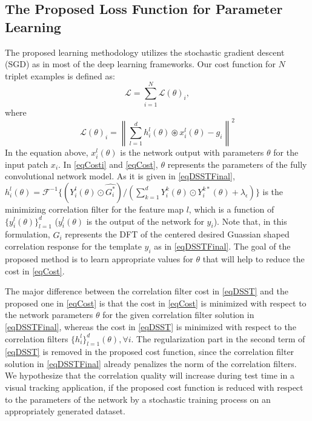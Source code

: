 \documentclass[journal]{IEEEtran}
\begin{document}
\subsection{The Proposed Loss Function for Parameter Learning}
The proposed learning methodology utilizes the stochastic gradient descent (SGD) as in most of the deep learning frameworks. Our cost function for $N$ triplet examples is defined as:
\begin{equation}
\label{eqCost}
\mathcal{L} = \sum\limits_{i=1}^N \mathcal{L}(\theta)_i,
\end{equation}
where
\begin{equation}
\label{eqCosti}
\mathcal{L}(\theta)_i={\left \| \sum\limits_{l=1}^d h^l_i (\theta) \circledast x^l_i(\theta) - g_i\right \|}^2
\end{equation}
In the equation above, $x_i^l(\theta)$ is the network output with parameters $\theta$ for the input patch $x_i$. In \eqref{eqCosti} and \eqref{eqCost}, $\theta$ represents the parameters of the fully convolutional network model. As it is given in \eqref{eqDSSTFinal}, $h^l_i (\theta)=\mathcal{F}^{-1}\{{(Y^l_i(\theta)\odot \hat{G_i^*})}/({\sum\limits_{k=1}^d Y^k_i(\theta)\odot Y_i^{k*}(\theta)+ \lambda_\epsilon})\}$ is the minimizing correlation filter for the feature map $l$, which is a function of $\{y_i^l(\theta)\}_{l=1}^d$ ($y_i^l(\theta)$ is the output of the network for $y_i$). Note that, in this formulation, $\hat{G_i}$ represents the DFT of the centered desired Guassian shaped correlation response for the template $y_i$ as in \eqref{eqDSSTFinal}. The goal of the proposed method is to learn appropriate values for $\theta$ that will help to reduce the cost in \eqref{eqCost}.

The major difference between the correlation filter cost in \eqref{eqDSST} and the proposed one in \eqref{eqCost} is that the cost in \eqref{eqCost} is minimized with respect to the network parameters $\theta$ for the given correlation filter solution in \eqref{eqDSSTFinal}, whereas the cost in \eqref{eqDSST} is minimized with respect to the correlation filters $\{h^l_i\}_{l=1}^d(\theta), \forall i$. The regularization part in the second term of \eqref{eqDSST} is removed in the proposed cost function, since the correlation filter solution in \eqref{eqDSSTFinal} already penalizes the norm of the correlation filters.
We hypothesize that the correlation quality will increase during test time in a visual tracking application, if the proposed cost function is reduced with respect to the parameters of the network by a stochastic training process on an appropriately generated dataset.
\end{document}

